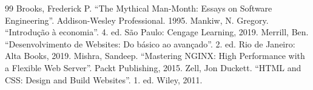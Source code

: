 \documentclass[12pt]{article}
\begin{document}

\begin{thebibliography}{99}
 Brooks, Frederick P. ``The Mythical Man-Month: Essays on Software Engineering''. Addison-Wesley Professional. 1995.
 Mankiw, N. Gregory. ``Introdução à economia''. 4. ed. São Paulo: Cengage Learning, 2019.
 Merrill, Ben. ``Desenvolvimento de Websites: Do básico ao avançado''. 2. ed. Rio de Janeiro: Alta Books, 2019.
 Mishra, Sandeep. ``Mastering NGINX: High Performance with a Flexible Web Server''. Packt Publishing, 2015.
 Zell, Jon Duckett. ``HTML and CSS: Design and Build Websites''. 1. ed. Wiley, 2011.
\end{thebibliography}
\end{document}
